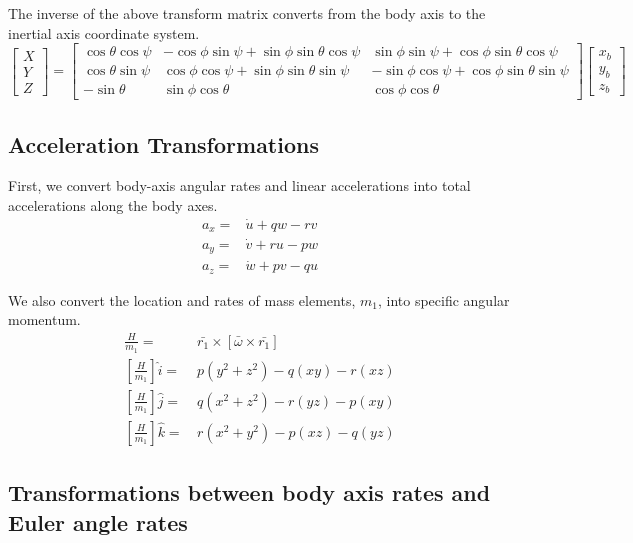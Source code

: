 \documentclass[
]{book}
\begin{document}
The inverse of the above transform matrix converts from the body axis to the inertial axis coordinate system.
\[
\begin{bmatrix}
X \\
Y \\
Z
\end{bmatrix} = 
\begin{bmatrix}
\cos\theta \cos\psi & - \cos\phi \sin\psi + \sin\phi \sin\theta \cos\psi & \sin\phi \sin\psi + \cos\phi \sin\theta \cos\psi \\
\cos\theta \sin\psi & \cos\phi \cos\psi + \sin\phi \sin\theta \sin\psi & -\sin\phi \cos\psi + \cos\phi \sin\theta \sin\psi  \\
-\sin\theta & \sin\phi \cos\theta & \cos\phi \cos\theta
\end{bmatrix}
\begin{bmatrix}
x_b \\
y_b \\
z_b 
\end{bmatrix}
\]

\hypertarget{acceleration-transformations}{%
\subsection{Acceleration Transformations}\label{acceleration-transformations}}

First, we convert body-axis angular rates and linear accelerations into total accelerations along the body axes.
\[
\begin{align}
a_x =& \dot{u} + qw - rv \\
a_y =& \dot{v} + ru -pw \\
a_z =& \dot{w} + pv - qu
\end{align}
\]

We also convert the location and rates of mass elements, \(m_1\), into specific angular momentum.
\[
\begin{align}
\frac{H}{m_1} =& \, \bar{r_1} \times [\bar{\omega} \times \bar{r_1}] \\
\left[ \frac{H}{m_1} \right]\hat{i} =& \, p(y^2 + z^2) - q(xy) - r(xz)\\
\left[ \frac{H}{m_1} \right]\hat{j} =& \, q(x^2+z^2) - r(yz) - p(xy)\\
\left[ \frac{H}{m_1} \right] \hat{k} =& \, r(x^2+y^2) - p(xz) - q(yz)
\end{align}
\]

\hypertarget{transformations-between-body-axis-rates-and-euler-angle-rates}{%
\subsection{Transformations between body axis rates and Euler angle rates}\label{transformations-between-body-axis-rates-and-euler-angle-rates}}
\end{document}
